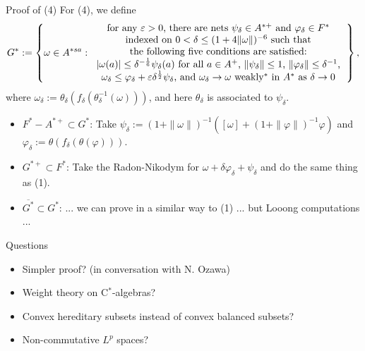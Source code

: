 \documentclass{../../../slide}
\begin{document}
\begin{frame}{Proof of (4)}
For (4), we define
\pause
\[G^*:=\left\{\omega\in A^{*sa}:\begin{tabular}{c}
for any $\varepsilon>0$, there are nets $\psi_\delta\in A^{*+}$ and $\varphi_\delta\in F^*$\\
indexed on $0<\delta\le(1+4\|\omega\|)^{-6}$ such that\\
the following five conditions are satisfied:\\
 $|\omega(a)|\le\delta^{-\frac16}\psi_\delta(a)$ for all $a\in A^+$, $\|\psi_\delta\|\le1$, $\|\varphi_\delta\|\le\delta^{-1}$,\\
$\omega_\delta\le\varphi_\delta+\varepsilon\delta^{\frac12}\psi_\delta$, and $\omega_\delta\to\omega$ weakly$^*$ in $A^*$ as $\delta\to0$
\end{tabular}\right\},\]
where $\omega_\delta:=\theta_\delta(f_\delta(\theta_\delta^{-1}(\omega)))$, and here $\theta_\delta$ is associated to $\psi_\delta$.
\pause
\begin{itemize}
\item $F^*-A^{*+}\subset G^*$: Take $\psi_\delta:=(1+\|\omega\|)^{-1}([\omega]+(1+\|\varphi\|)^{-1}\varphi)$ and $\varphi_\delta:=\theta(f_\delta(\theta(\varphi)))$.
\item $G^{*+}\subset F^*$: Take the Radon-Nikodym for $\omega+\delta\varphi_\delta+\psi_\delta$ and do the same thing as (1).
\item $\overline{G^*}\subset G^*$: ... we can prove in a similar way to (1) ... but Looong computations ...
\end{itemize}
\end{frame}


\begin{frame}{Questions}
\begin{itemize}
\item Simpler proof? (in conversation with N. Ozawa)
\item Weight theory on C$^*$-algebras?
\item Convex hereditary subsets instead of convex balanced subsets?
\item Non-commutative $L^p$ spaces?
\end{itemize}
\end{frame}

\end{document}
